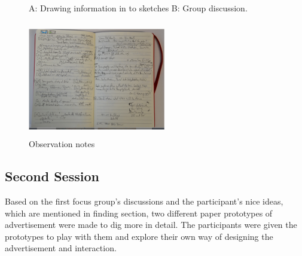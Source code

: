 \begin{figure}[H]
    \centering
    \caption{A: Drawing information in to sketches B: Group discussion. }%
    \label{fig:observation_env}%
\end{figure}


\begin{figure}[H]
    \centering
    \includegraphics[width=6cm, height=5cm]{Figures/4/notes}%
    \caption{Observation notes}%
    \label{fig:observation_note}%
\end{figure}


\subsection{Second Session}
Based on the first focus group's discussions and the participant's nice ideas, which are mentioned in finding section, two different paper prototypes of advertisement were made to dig more in detail. The participants were given the prototypes to play with them and explore their own way of designing the advertisement and interaction.

